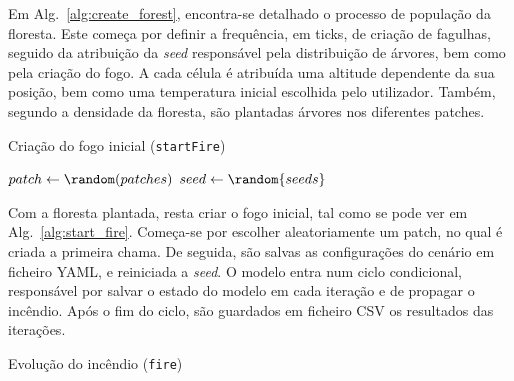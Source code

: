 Em Alg.~\ref{alg:create_forest}, encontra-se detalhado o processo de população da floresta. Este começa por definir a frequência, em ticks, de criação de fagulhas, seguido da atribuição da \textit{seed} responsável pela distribuição de árvores, bem como pela criação do fogo. A cada célula é atribuída uma altitude dependente da sua posição, bem como uma temperatura inicial escolhida pelo utilizador. Também, segundo a densidade da floresta, são plantadas árvores nos diferentes patches.


\begin{algorithm}
    \caption{Criação do fogo inicial (\texttt{startFire})}\label{alg:start_fire}
    $patch \gets \random(patches)$\;
    \;
    \saveConfig{}\;
    $seed \gets \random{seeds}$\;
    \While{\anyTreesBurning{}}{
        \saveIteration{}\;
        \fire{}\;
    }
    \saveIterations{}\;
\end{algorithm}

Com a floresta plantada, resta criar o fogo inicial, tal como se pode ver em Alg.~\ref{alg:start_fire}. Começa-se por escolher aleatoriamente um patch, no qual é criada a primeira chama. De seguida, são salvas as configurações do cenário em ficheiro YAML, e reiniciada a \textit{seed}. O modelo entra num ciclo condicional, responsável por salvar o estado do modelo em cada iteração e de propagar o incêndio. Após o fim do ciclo, são guardados em ficheiro CSV os resultados das iterações.


\begin{algorithm}
    \caption{Evolução do incêndio (\texttt{fire})}\label{alg:fire}
    \fadeEmbers{}\;
    \tick{}\;
\end{algorithm}

